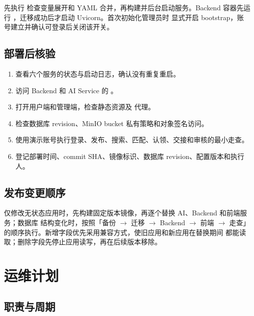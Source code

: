 先执行  检查变量展开和 YAML 合并，再构建并后台启动服务。Backend
容器先运行 ，迁移成功后才启动 Uvicorn。首次初始化管理员时
显式开启 bootstrap，账号建立并确认可登录后关闭该开关。

\subsection{部署后核验}

\begin{enumerate}
  \item 查看六个服务的状态与启动日志，确认没有重复重启。
  \item 访问 Backend 和 AI Service 的 。
  \item 打开用户端和管理端，检查静态资源及  代理。
  \item 检查数据库 revision、MinIO bucket 私有策略和对象签名访问。
  \item 使用演示账号执行登录、发布、搜索、匹配、认领、交接和审核的最小走查。
  \item 登记部署时间、commit SHA、镜像标识、数据库 revision、配置版本和执行人。
\end{enumerate}

\subsection{发布变更顺序}

仅修改无状态应用时，先构建固定版本镜像，再逐个替换 AI、Backend 和前端服务；数据库
结构变化时，按照「备份 $\rightarrow$ 迁移 $\rightarrow$ Backend $\rightarrow$ 前端
$\rightarrow$ 走查」的顺序执行。新增字段优先采用兼容方式，使旧应用和新应用在替换期间
都能读取；删除字段先停止应用读写，再在后续版本移除。

\section{运维计划}

\subsection{职责与周期}

